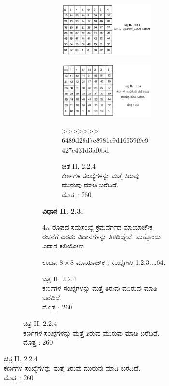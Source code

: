 \begin{figure}[H]
\begin{figure}[H]
\begin{figure}[h]
\begin{itemize}
\begin{figure}[H]
	\end{figure}
	\begin{figure}[H]
	\includegraphics[scale=.8]{src/figures/chap3/fig3.22.jpg}
	\end{figure}
	\begin{figure}[H]
	\includegraphics[scale=.8]{src/figures/chap3/fig3.23.jpg}
	\caption{ಚಿತ್ರ II. 2.2.4 \\ ಕರ್ಣಗಳ ಸಂಖ್ಯೆಗಳನ್ನು ಮತ್ತೆ ತಿರುವು ಮುರುವು ಮಾಡಿ ಬರೆದಿದೆ. \\ ಮೊತ್ತ : 260}
>>>>>>> 6489d29d7c8981e9d16559f9e9427e431d3af0bd
	\end{figure}
\end{itemize}
\textbf{ವಿಧಾನ II. 2.3.}

$4n$ ರೂಪದ ಸಮಸಂಖ್ಯೆ ಕ್ರಮವರ್ಗದ ಮಾಯಾಚೌಕ ರಚನೆಗೆ ಎರಡು ವಿಧಾನಗಳನ್ನು ತಿಳಿದಿದ್ದೇವೆ. ಮತ್ತೊಂದು ವಿಧಾನ ಕಲಿಯೋಣ.

ಉದಾ: $8 \times 8$ ಮಾಯಾಚೌಕ ; ಸಂಖ್ಯೆಗಳು 1,2,3....64.


\end{figure}
\end{figure}
\end{figure}
